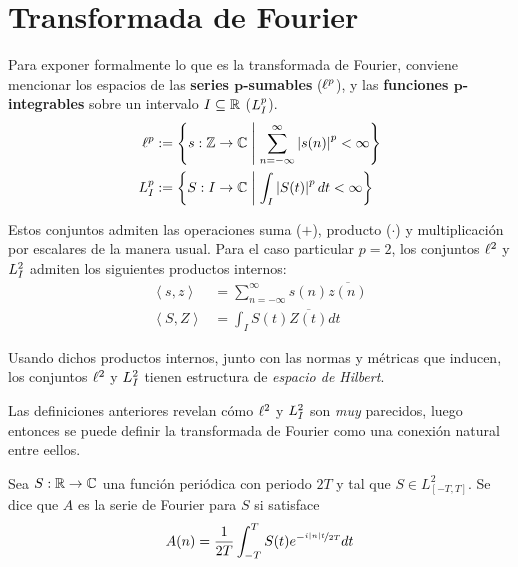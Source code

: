 
\section{Transformada de Fourier}

Para exponer formalmente lo que es la transformada de Fourier, conviene mencionar los espacios de 
las \textbf{series $\boldsymbol{p}$-sumables} ($\ell^{p}$), y las  \textbf{funciones 
$\boldsymbol{p}$-integrables} sobre un intervalo $I \subseteq \mathbb{R}$ ($L^{p}_I$).
\begin{align*}
\ell^{p} &:= \left\{ s: \mathbb{Z}\rightarrow\mathbb{C} \mathrel{}\middle|\mathrel{} \sum_{n=-\infty}^{\infty} \left| s(n) \right|^{p} < \infty \right\}
\\
L^{p}_I &:= \left\{ S: I\rightarrow\mathbb{C} \mathrel{}\middle|\mathrel{} \int_I \left| S(t) \right|^{p} dt < \infty \right\}
\end{align*}

Estos conjuntos admiten las operaciones  suma ($+$), producto ($\cdot$) y multiplicación por 
escalares de la manera usual.
%
Para el caso particular $p=2$, los conjuntos $\ell^{2}$ y $L^{2}_I$ admiten los siguientes productos 
internos:
%
\begin{align*}
\left\langle s,z \right\rangle &= \sum_{n=-\infty}^{\infty} s(n) \overline{z(n)}\\
\left\langle S,Z \right\rangle &= \int_I S(t) \overline{Z(t)} dt
\end{align*}

Usando dichos productos internos, junto con las normas y métricas que inducen, los conjuntos 
$\ell^{2}$ y $L^{2}_I$ tienen estructura de \textit{espacio de Hilbert}.

Las definiciones anteriores revelan cómo $\ell^{2}$ y $L^{2}_I$ son \textit{muy} parecidos, luego
entonces se puede definir la transformada de Fourier como una conexión natural entre eellos.

\begin{definicion}
Sea $S: \mathbb{R} \rightarrow \mathbb{C}$ una función periódica con periodo $2T$ y tal que 
$S \in L^{2}_{[-T,T]}$. Se dice que $A$ es la serie de Fourier para $S$ si satisface
\begin{equation*}
A(n) = \frac{1}{2 T} \int_{- T }^{ T } S(t) e^{-\nicefrac{ i \left| n \right| t}{2T}} dt
\end{equation*}
\label{FourierClasico}
\end{definicion}

